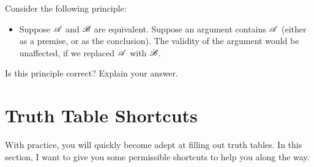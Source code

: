 \problempart 
Consider the following principle:
	\begin{itemize}
		\item Suppose $\mathscr{A}$ and $\mathscr{B}$ are equivalent. Suppose an argument contains $\mathscr{A}$ (either as a premise, or as the conclusion). The validity of the argument would be unaffected, if we replaced $\mathscr{A}$ with $\mathscr{B}$.
	\end{itemize}
Is this principle correct? Explain your answer.



\chapter{Truth Table Shortcuts}\label{s:shortcuts}
With practice, you will quickly become adept at filling out truth tables. In this section, I want to give you some permissible shortcuts to help you along the way. 

